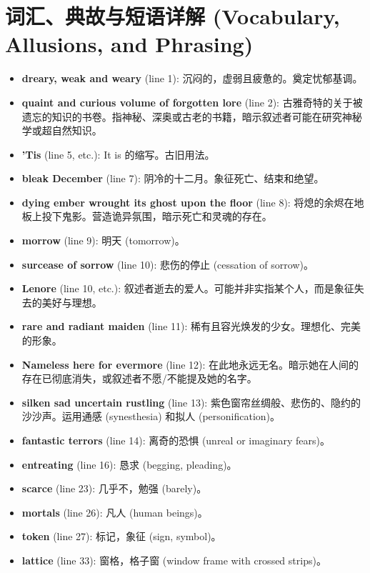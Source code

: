 \documentclass[12pt, a4paper]{article}
\begin{document}
\section{词汇、典故与短语详解 (Vocabulary, Allusions, and Phrasing)}

\begin{itemize}
    \item \textbf{dreary, weak and weary} (line 1): 沉闷的，虚弱且疲惫的。奠定忧郁基调。
    \item \textbf{quaint and curious volume of forgotten lore} (line 2): 古雅奇特的关于被遗忘的知识的书卷。指神秘、深奥或古老的书籍，暗示叙述者可能在研究神秘学或超自然知识。
    \item \textbf{'Tis} (line 5, etc.): It is 的缩写。古旧用法。
    \item \textbf{bleak December} (line 7): 阴冷的十二月。象征死亡、结束和绝望。
    \item \textbf{dying ember wrought its ghost upon the floor} (line 8): 将熄的余烬在地板上投下鬼影。营造诡异氛围，暗示死亡和灵魂的存在。
    \item \textbf{morrow} (line 9): 明天 (tomorrow)。
    \item \textbf{surcease of sorrow} (line 10): 悲伤的停止 (cessation of sorrow)。
    \item \textbf{Lenore} (line 10, etc.): 叙述者逝去的爱人。可能并非实指某个人，而是象征失去的美好与理想。
    \item \textbf{rare and radiant maiden} (line 11): 稀有且容光焕发的少女。理想化、完美的形象。
    \item \textbf{Nameless here for evermore} (line 12): 在此地永远无名。暗示她在人间的存在已彻底消失，或叙述者不愿/不能提及她的名字。
    \item \textbf{silken sad uncertain rustling} (line 13): 紫色窗帘丝绸般、悲伤的、隐约的沙沙声。运用通感 (synesthesia) 和拟人 (personification)。
    \item \textbf{fantastic terrors} (line 14): 离奇的恐惧 (unreal or imaginary fears)。
    \item \textbf{entreating} (line 16): 恳求 (begging, pleading)。
    \item \textbf{scarce} (line 23): 几乎不，勉强 (barely)。
    \item \textbf{mortals} (line 26): 凡人 (human beings)。
    \item \textbf{token} (line 27): 标记，象征 (sign, symbol)。
    \item \textbf{lattice} (line 33): 窗格，格子窗 (window frame with crossed strips)。

\end{itemize}
\end{document}
